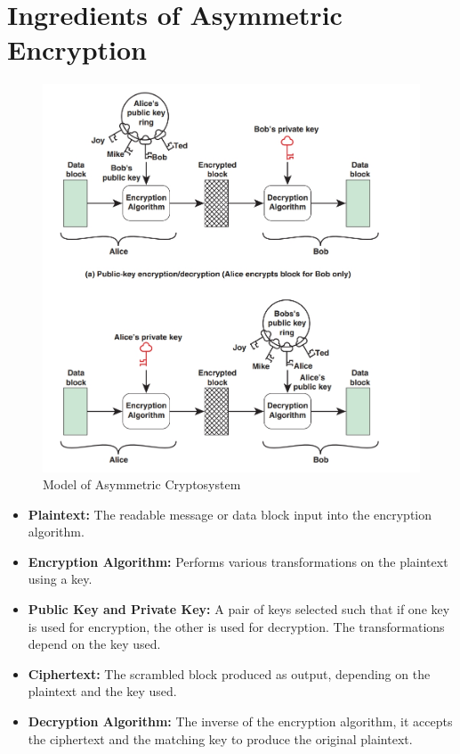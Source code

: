 \section{Ingredients of Asymmetric Encryption}
\begin{figure}
    \centering
    \includegraphics[width=1\linewidth]{Data_Privacy_and_Cryptography/Figures/model of asymmetric crypto.jpeg}
    \caption{Model of Asymmetric Cryptosystem}
    \label{fig:asymmetric}
\end{figure}
\begin{itemize}
    \item \textbf{Plaintext:} The readable message or data block input into the encryption algorithm.
    \item \textbf{Encryption Algorithm:} Performs various transformations on the plaintext using a key.
    \item \textbf{Public Key and Private Key:} A pair of keys selected such that if one key is used for encryption, the other is used for decryption. The transformations depend on the key used.
    \item \textbf{Ciphertext:} The scrambled block produced as output, depending on the plaintext and the key used.
    \item \textbf{Decryption Algorithm:} The inverse of the encryption algorithm, it accepts the ciphertext and the matching key to produce the original plaintext.
\end{itemize}

